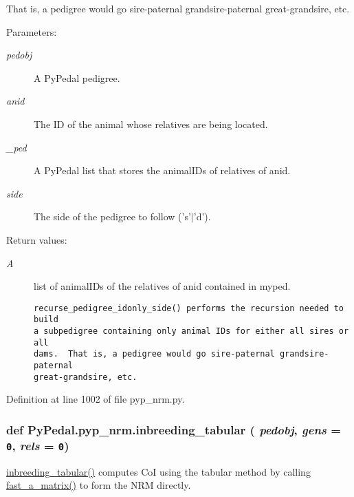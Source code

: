 That is, a pedigree would go sire-paternal grandsire-paternal great-grandsire, etc. \begin{Desc}
\item[Parameters:]
\begin{description}
\item[{\em pedobj}]A Py\-Pedal pedigree. \item[{\em anid}]The ID of the animal whose relatives are being located. \item[{\em \_\-ped}]A Py\-Pedal list that stores the animal\-IDs of relatives of anid. \item[{\em side}]The side of the pedigree to follow ('s'$|$'d'). \end{description}
\end{Desc}
\begin{Desc}
\item[Return values:]
\begin{description}
\item[{\em A}]list of animal\-IDs of the relatives of anid contained in myped.

\footnotesize\begin{verbatim}recurse_pedigree_idonly_side() performs the recursion needed to build
a subpedigree containing only animal IDs for either all sires or all
dams.  That is, a pedigree would go sire-paternal grandsire-paternal
great-grandsire, etc.
\end{verbatim}
\normalsize
 \end{description}
\end{Desc}


Definition at line 1002 of file pyp\_\-nrm.py.\hypertarget{namespacePyPedal_1_1pyp__nrm_ca22371da820f4c44272c0c49813bda2}{
\subsubsection[inbreeding\_\-tabular]{\setlength{\rightskip}{0pt plus 5cm}def Py\-Pedal.pyp\_\-nrm.inbreeding\_\-tabular ( {\em pedobj},  {\em gens} = {\tt 0},  {\em rels} = {\tt 0})}}
\label{namespacePyPedal_1_1pyp__nrm_ca22371da820f4c44272c0c49813bda2}


\hyperlink{namespacePyPedal_1_1pyp__nrm_ca22371da820f4c44272c0c49813bda2}{inbreeding\_\-tabular()} computes Co\-I using the tabular method by calling \hyperlink{namespacePyPedal_1_1pyp__nrm_d86974b6cb70f5165d7f9b41b68b613e}{fast\_\-a\_\-matrix()} to form the NRM directly. 


